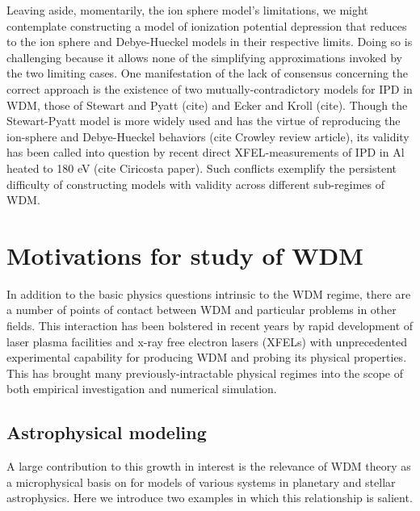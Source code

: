 \documentclass [11pt, proquest, article] {uwthesis}[2016/11/22]
\begin{document}

Leaving aside, momentarily, the ion sphere model's limitations, we might contemplate constructing a model of ionization potential depression that reduces to the ion sphere and Debye-Hueckel models in their respective limits. Doing so is challenging because it allows none of the simplifying approximations invoked by the two limiting cases. One manifestation of the lack of consensus concerning the correct approach is the existence of two mutually-contradictory models for IPD in WDM, those of Stewart and Pyatt (cite) and Ecker and Kroll (cite). Though the Stewart-Pyatt model is more widely used and has the virtue of reproducing the ion-sphere and Debye-Hueckel behaviors (cite Crowley review article), its validity has been called into question by recent direct XFEL-measurements of IPD in Al heated to 180 eV (cite Ciricosta paper). Such conflicts exemplify the persistent difficulty of constructing models with validity across different sub-regimes of WDM.


\section{Motivations for study of WDM}
In addition to the basic physics questions intrinsic to the WDM regime, there are a number of points of contact between WDM and particular problems in other fields. This interaction has been bolstered in recent years by rapid development of laser plasma facilities and x-ray free electron lasers (XFELs) with unprecedented experimental capability for producing WDM and probing its physical properties. This has brought many previously-intractable physical regimes into the scope of both empirical investigation and numerical simulation.  

\subsection{Astrophysical modeling}
A large contribution to this growth in interest is the relevance of WDM theory as a microphysical basis on for models of various systems in planetary and stellar astrophysics. Here we introduce two examples in which this relationship is salient.
\end{document}
